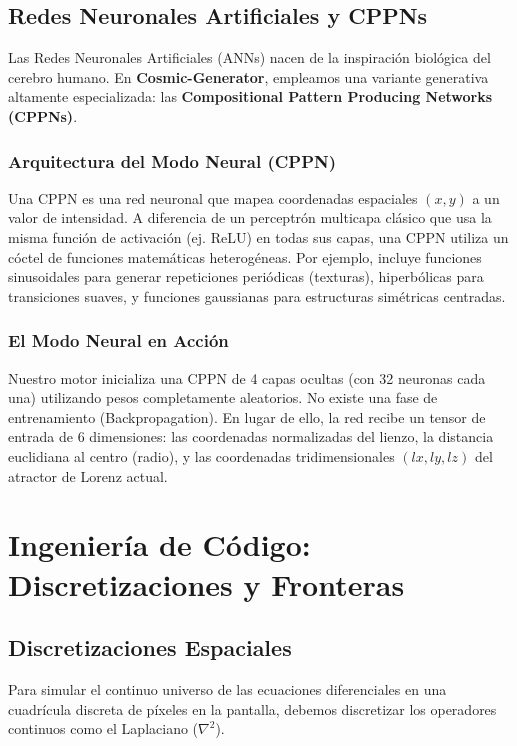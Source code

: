 \documentclass[12pt, openany]{book}
\begin{document}
\chapter{Redes Neuronales Artificiales y CPPNs}
Las Redes Neuronales Artificiales (ANNs) nacen de la inspiración biológica del cerebro humano. En \textbf{Cosmic-Generator}, empleamos una variante generativa altamente especializada: las \textbf{Compositional Pattern Producing Networks (CPPNs)}.

\section{Arquitectura del Modo Neural (CPPN)}
Una CPPN es una red neuronal que mapea coordenadas espaciales $(x, y)$ a un valor de intensidad. A diferencia de un perceptrón multicapa clásico que usa la misma función de activación (ej. ReLU) en todas sus capas, una CPPN utiliza un cóctel de funciones matemáticas heterogéneas. Por ejemplo, incluye funciones sinusoidales para generar repeticiones periódicas (texturas), hiperbólicas para transiciones suaves, y funciones gaussianas para estructuras simétricas centradas.

\section{El Modo Neural en Acción}
Nuestro motor inicializa una CPPN de 4 capas ocultas (con 32 neuronas cada una) utilizando pesos completamente aleatorios. No existe una fase de entrenamiento (Backpropagation). En lugar de ello, la red recibe un tensor de entrada de 6 dimensiones: las coordenadas normalizadas del lienzo, la distancia euclidiana al centro (radio), y las coordenadas tridimensionales $(lx, ly, lz)$ del atractor de Lorenz actual.
\part{Ingeniería de Código: Discretizaciones y Fronteras}


\chapter{Discretizaciones Espaciales}
Para simular el continuo universo de las ecuaciones diferenciales en una cuadrícula discreta de píxeles en la pantalla, debemos discretizar los operadores continuos como el Laplaciano ($\nabla^2$).
\end{document}
